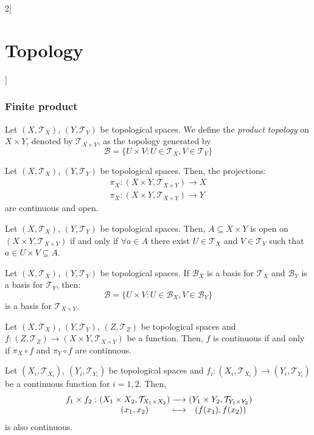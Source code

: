 \documentclass[../../../main.tex]{subfiles}
\begin{document}
\begin{multicols}{2}[\section{Topology}]
  \subsubsection{Finite product}
  \begin{definition}
    Let $(X,\mathcal{T}_X)$, $(Y,\mathcal{T}_Y)$ be topological spaces. We define the \textit{product topology} on $X\times Y$, denoted by $\mathcal{T}_{X\times Y}$, as the topology generated by $$\mathcal{B}=\{U\times V:U\in\mathcal{T}_X,V\in\mathcal{T}_Y\}$$
  \end{definition}
  \begin{prop}
    Let $(X,\mathcal{T}_X)$, $(Y,\mathcal{T}_Y)$ be topological spaces. Then, the projections:
    \begin{align*}
      \pi_X:(X\times Y,\mathcal{T}_{X\times Y})\longrightarrow X \\
      \pi_X:(X\times Y,\mathcal{T}_{X\times Y})\longrightarrow Y
    \end{align*}
    are continuous and open.
  \end{prop}
  \begin{prop}
    Let $(X,\mathcal{T}_X)$, $(Y,\mathcal{T}_Y)$ be topological spaces. Then, $A\subseteq X\times Y$ is open on $(X\times Y,\mathcal{T}_{X\times Y})$ if and only if $\forall a\in A$ there exist $U\in\mathcal{T}_X$ and $V\in\mathcal{T}_Y$ such that $a\in U\times V\subseteq A$.
  \end{prop}
  \begin{prop}
    Let $(X,\mathcal{T}_X)$, $(Y,\mathcal{T}_Y)$ be topological spaces. If $\mathcal{B}_X$ is a basis for $\mathcal{T}_X$ and $\mathcal{B}_Y$ is a basis for $\mathcal{T}_Y$, then: $$\mathcal{B}=\{U\times V:U\in\mathcal{B}_X,V\in\mathcal{B}_Y\}$$
    is a basis for $\mathcal{T}_{X\times Y}$.
  \end{prop}
  \begin{prop}
    Let $(X,\mathcal{T}_X)$, $(Y,\mathcal{T}_Y)$, $(Z,\mathcal{T}_Z)$ be topological spaces and $f:(Z,\mathcal{T}_Z)\rightarrow(X\times Y,\mathcal{T}_{X\times Y})$ be a function. Then, $f$ is continuous if and only if $\pi_X\circ f$ and $\pi_Y\circ f$ are continuous.
  \end{prop}
  \begin{prop}
    Let $(X_i,\mathcal{T}_{X_i})$, $(Y_i,\mathcal{T}_{Y_i})$ be topological spaces and $f_i:(X_i,\mathcal{T}_{X_i})\rightarrow(Y_i,\mathcal{T}_{Y_i})$ be a continuous function for $i=1,2$. Then,
    $$
      \function{f_1\times f_2}{(X_1\times X_2,\mathcal{T}_{X_1\times X_2})}{(Y_1\times Y_2,\mathcal{T}_{Y_1\times Y_2})}{(x_1,x_2)}{(f(x_1),f(x_2))}
    $$ is also continuous.
  \end{prop}

\end{multicols}
\end{document}
